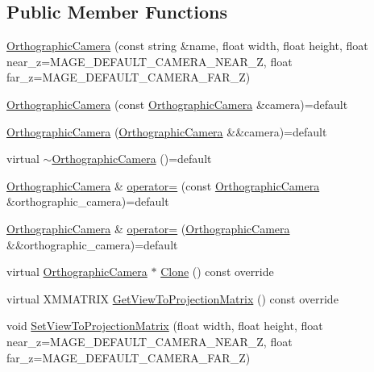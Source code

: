 \subsection*{Public Member Functions}
\begin{DoxyCompactItemize}
\item 
\hyperlink{classmage_1_1_orthographic_camera_a7d8b48144b0ef2e2f0aa4f06f3858abd}{Orthographic\+Camera} (const string \&name, float width, float height, float near\+\_\+z=M\+A\+G\+E\+\_\+\+D\+E\+F\+A\+U\+L\+T\+\_\+\+C\+A\+M\+E\+R\+A\+\_\+\+N\+E\+A\+R\+\_\+Z, float far\+\_\+z=M\+A\+G\+E\+\_\+\+D\+E\+F\+A\+U\+L\+T\+\_\+\+C\+A\+M\+E\+R\+A\+\_\+\+F\+A\+R\+\_\+Z)
\item 
\hyperlink{classmage_1_1_orthographic_camera_a0293f01356417e9f32db027ba92d6029}{Orthographic\+Camera} (const \hyperlink{classmage_1_1_orthographic_camera}{Orthographic\+Camera} \&camera)=default
\item 
\hyperlink{classmage_1_1_orthographic_camera_a6abe78fc17b583046b30a459f9ef07ef}{Orthographic\+Camera} (\hyperlink{classmage_1_1_orthographic_camera}{Orthographic\+Camera} \&\&camera)=default
\item 
virtual \hyperlink{classmage_1_1_orthographic_camera_abdad923634e17f217ba975a9149f6c57}{$\sim$\+Orthographic\+Camera} ()=default
\item 
\hyperlink{classmage_1_1_orthographic_camera}{Orthographic\+Camera} \& \hyperlink{classmage_1_1_orthographic_camera_a2708bae64577677d4d5d1722a9ce0e9f}{operator=} (const \hyperlink{classmage_1_1_orthographic_camera}{Orthographic\+Camera} \&orthographic\+\_\+camera)=default
\item 
\hyperlink{classmage_1_1_orthographic_camera}{Orthographic\+Camera} \& \hyperlink{classmage_1_1_orthographic_camera_aaf29c1fcc52d0a5e6cfdb65b9c840174}{operator=} (\hyperlink{classmage_1_1_orthographic_camera}{Orthographic\+Camera} \&\&orthographic\+\_\+camera)=default
\item 
virtual \hyperlink{classmage_1_1_orthographic_camera}{Orthographic\+Camera} $\ast$ \hyperlink{classmage_1_1_orthographic_camera_ae075c08e4af88f74212bf5c84d2e5b2a}{Clone} () const override
\item 
virtual X\+M\+M\+A\+T\+R\+IX \hyperlink{classmage_1_1_orthographic_camera_aedd86e56a0f7bc967ad8d9be2631a0cf}{Get\+View\+To\+Projection\+Matrix} () const override
\item 
void \hyperlink{classmage_1_1_orthographic_camera_a1ff2b3e4467049b978155d652a687c2d}{Set\+View\+To\+Projection\+Matrix} (float width, float height, float near\+\_\+z=M\+A\+G\+E\+\_\+\+D\+E\+F\+A\+U\+L\+T\+\_\+\+C\+A\+M\+E\+R\+A\+\_\+\+N\+E\+A\+R\+\_\+Z, float far\+\_\+z=M\+A\+G\+E\+\_\+\+D\+E\+F\+A\+U\+L\+T\+\_\+\+C\+A\+M\+E\+R\+A\+\_\+\+F\+A\+R\+\_\+Z)
\end{DoxyCompactItemize}
